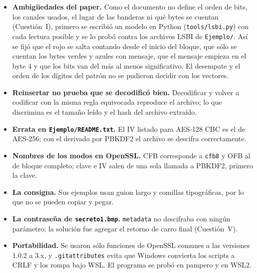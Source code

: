
\begin{itemize}
\item \textbf{Ambigüedades del paper.} Como el documento no define el orden de bits, los canales usados, el lugar de las banderas ni qué bytes se cuentan
(Cuestión~I), primero se escribió un modelo en Python (\texttt{tools/lsbi.py}) con cada lectura posible y se lo probó contra los archivos LSBI de
\texttt{Ejemplo/}. Así se fijó que el rojo se salta contando desde el inicio del bloque, que sólo se cuentan los bytes verdes y azules con mensaje, que el
mensaje empieza en el byte 4 y que los bits van del más al menos significativo. El desempate y el orden de los dígitos del patrón no se pudieron decidir con los vectores.
\item \textbf{Reinsertar no prueba que se decodificó bien.} Decodificar y volver a codificar con la misma regla equivocada reproduce el archivo; lo que discrimina es el tamaño leído y el hash del archivo extraído.
\item \textbf{Errata en \texttt{Ejemplo/README.txt}.} El IV listado para AES-128 CBC es el de AES-256; con el derivado por PBKDF2 el archivo se descifra correctamente.
\item \textbf{Nombres de los modos en OpenSSL.} CFB corresponde a \texttt{cfb8} y OFB al de bloque completo; clave e IV salen de una sola llamada a PBKDF2, primero la clave.
\item \textbf{La consigna.} Sus ejemplos usan guion largo y comillas tipográficas, por lo que no se pueden copiar y pegar.
\item \textbf{La contraseña de \texttt{secreto1.bmp}.} \texttt{metadata} no descifraba con ningún parámetro; la solución fue agregar el retorno de carro final (Cuestión~V).
\item \textbf{Portabilidad.} Se usaron sólo funciones de OpenSSL comunes a las versiones 1.0.2 a 3.x, y \texttt{.gitattributes} evita que Windows convierta los scripts a CRLF y los rompa bajo WSL. El programa se probó en pampero y en WSL2.
\end{itemize}

